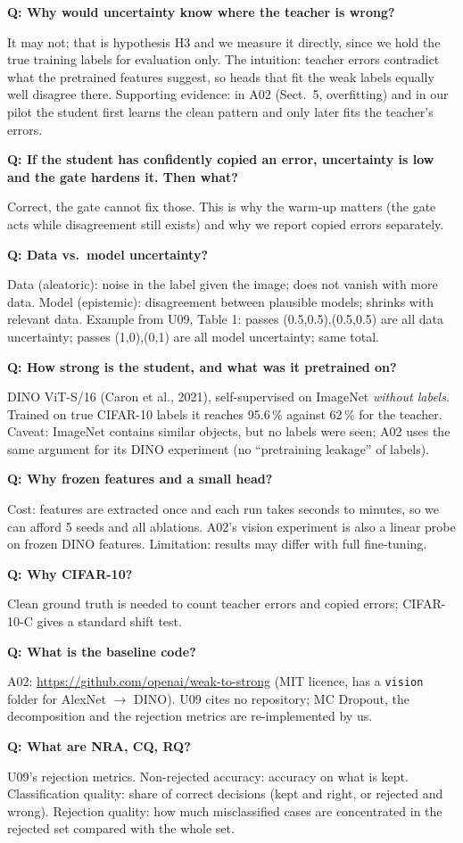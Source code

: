 \documentclass[10pt,a4paper]{article}
\newcommand{\Q}[1]{\par\medskip\noindent\textbf{Q: #1}\par\noindent}
\begin{document}
\Q{Why would uncertainty know where the teacher is wrong?} It may not; that is hypothesis H3 and we measure it
directly, since we hold the true training labels for evaluation only. The intuition: teacher errors contradict
what the pretrained features suggest, so heads that fit the weak labels equally well disagree there.
Supporting evidence: in A02 (Sect.\ 5, overfitting) and in our pilot the student first learns the clean
pattern and only later fits the teacher's errors.

\Q{If the student has confidently copied an error, uncertainty is low and the gate hardens it. Then what?}
Correct, the gate cannot fix those. This is why the warm-up matters (the gate acts while disagreement still
exists) and why we report copied errors separately.

\Q{Data vs.\ model uncertainty?} Data (aleatoric): noise in the label given the image; does not vanish with more
data. Model (epistemic): disagreement between plausible models; shrinks with relevant data. Example from U09,
Table 1: passes (0.5,0.5),(0.5,0.5) are all data uncertainty; passes (1,0),(0,1) are all model uncertainty;
same total.

\Q{How strong is the student, and what was it pretrained on?} DINO ViT-S/16 (Caron et al., 2021),
self-supervised on ImageNet \emph{without labels}. Trained on true CIFAR-10 labels it reaches 95.6\,\% against
62\,\% for the teacher. Caveat: ImageNet contains similar objects, but no labels were seen; A02 uses the same
argument for its DINO experiment (no ``pretraining leakage'' of labels).

\Q{Why frozen features and a small head?} Cost: features are extracted once and each run takes seconds to
minutes, so we can afford 5 seeds and all ablations. A02's vision experiment is also a linear probe on frozen
DINO features. Limitation: results may differ with full fine-tuning.

\Q{Why CIFAR-10?} Clean ground truth is needed to count teacher errors and copied errors; CIFAR-10-C gives a
standard shift test.

\Q{What is the baseline code?} A02: \url{https://github.com/openai/weak-to-strong} (MIT licence, has a
\texttt{vision} folder for AlexNet $\to$ DINO). U09 cites no repository; MC Dropout, the decomposition and
the rejection metrics are re-implemented by us.

\Q{What are NRA, CQ, RQ?} U09's rejection metrics. Non-rejected accuracy: accuracy on what is kept.
Classification quality: share of correct decisions (kept and right, or rejected and wrong). Rejection quality:
how much misclassified cases are concentrated in the rejected set compared with the whole set.
\end{document}
